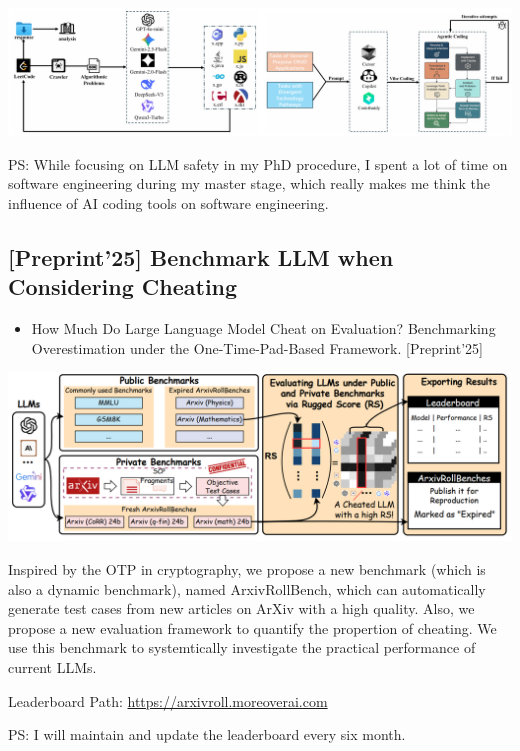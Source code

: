 \documentclass[11pt]{article}
\begin{document}
\begin{center}
\includegraphics[width=.9\linewidth]{./images/screenshot_20250927_203308.png}
\end{center}

PS: While focusing on LLM safety in my PhD procedure, I spent a lot of time on software engineering during my master stage, which really makes me think the influence of AI coding tools on software engineering.
\subsection{{[}Preprint'25] Benchmark LLM when Considering Cheating}
\label{sec:orgfc56b21}
\begin{itemize}
\item How Much Do Large Language Model Cheat on Evaluation? Benchmarking Overestimation under the One-Time-Pad-Based Framework. [Preprint'25]
\end{itemize}

\begin{center}
\includegraphics[width=.9\linewidth]{./images/screenshot_20250927_202632.png}
\end{center}  

Inspired by the OTP in cryptography, we propose a new benchmark (which is also a dynamic benchmark), named ArxivRollBench, which can automatically generate test cases from new articles on ArXiv with a high quality.
Also, we propose a new evaluation framework to quantify the propertion of cheating.
We use this benchmark to systemtically investigate the practical performance of current LLMs.

Leaderboard Path: \url{https://arxivroll.moreoverai.com}

PS: I will maintain and update the leaderboard every six month. 
\end{document}
